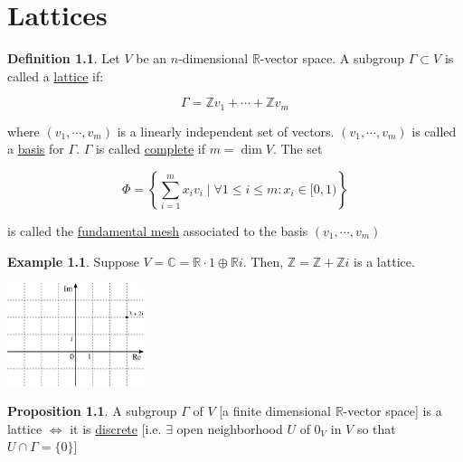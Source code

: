 \documentclass[openany]{amsbook}
\numberwithin{section}{chapter}
\theoremstyle{definition}
\newtheorem*{example}{Example}
\newtheorem*{definition}{Definition}
\newtheorem{proposition}[theorem]{Proposition}
\begin{document}
\chapter{Lattices}

\begin{definition}
    Let \(V\) be an \(n\)-dimensional \(\mathbb{R} \)-vector space. A subgroup \(\Gamma \subset V\) is called a \underline{lattice} if:

    \[
        \Gamma = \mathbb{Z} v_1 + \cdots + \mathbb{Z} v_m
    \]

    where \((v_1, \cdots , v_m)\) is a linearly independent set of vectors. \((v_1, \cdots , v_m)\) is called a \underline{basis} for \(\Gamma\). \(\Gamma\) is called \underline{complete} if \(m = \dim V\). The set

    \[
        \Phi = \left\{ \sum_{i=1}^m x_i v_i \mid \forall 1 \leq i \leq m : x_i \in [0,1)  \right\}
    \]

    is called the \underline{fundamental mesh} associated to the basis \((v_1, \cdots , v_m)\) 
\end{definition}

\begin{example}
    Suppose \(V = \mathbb{C} = \mathbb{R} \cdot 1 \oplus \mathbb{R} i\). Then, \(\mathbb{Z} = \mathbb{Z} + \mathbb{Z} i\) is a lattice.

    \begin{center}
        \includegraphics*[width=0.3\textwidth]{img/2D}
    \end{center}

\end{example}

\begin{proposition}
    A subgroup \(\Gamma\) of \(V\) [a finite dimensional \(\mathbb{R} \)-vector space] is a lattice \(\iff\) it is \underline{discrete} [i.e. \(\exists\) open neighborhood \(U\) of \(0_V\) in \(V\) so that \(U \cap \Gamma = \{ 0 \}\)]  
\end{proposition}
\end{document}
